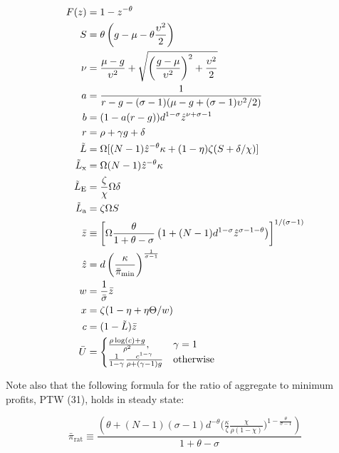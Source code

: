 \documentclass[11pt]{article}
\begin{document}
\begin{align}
	F(z) &= 1 - z^{-\theta} \\
	S &= \theta \left(g - \mu - \theta \frac{\upsilon^2}{2}\right) \\
	\nu &= \frac{\mu - g}{\upsilon^2} + \sqrt{\left(\frac{g - \mu}{\upsilon^2}\right)^2 + \frac{\upsilon^2}{2}} \\
	a &= \frac{1}{r - g - (\sigma - 1)(\mu - g  + (\sigma - 1)\upsilon^2/2)} \\
	b &= (1 - a(r-g))d^{1-\sigma}\hat{z}^{\nu + \sigma -1} \\
	r &= \rho + \gamma g + \delta \\
	\tilde{L} &= \Omega [(N-1)\hat{z}^{-\theta}\kappa + (1-\eta)\zeta(S + \delta/\chi)] \\
	\tilde{L}_{\text{x}} &= \Omega (N -1)\hat{z}^{-\theta}\kappa\\
	\tilde{L}_{\text{E}} &= \frac{\zeta}{\chi}\Omega\delta\\
	\tilde{L}_{\text{a}} &= \zeta \Omega S\\
	\bar{z}&\equiv \left[\Omega
	\frac{\theta}{1+\theta - \sigma}\left(1 + (N-1)d^{1-\sigma}\hat{z}^{\sigma - 1 -\theta} \right)\right]^{1/(\sigma - 1)} \\
	\hat{z} &= d \left(\frac{\kappa}{\bar{\pi}_{\textup{min}}}\right)^{\frac{1}{\sigma - 1}} \\
	w &= \frac{1}{\bar{\sigma}}\bar{z} \\
	x &= \zeta(1 - \eta + \eta \Theta / w) \\
		c &= (1 - \tilde{L})\bar{z} \\
		\bar{U} &=
	\begin{cases}
	\frac{\rho \log(c) + g}{\rho^2}, & \gamma = 1 \\
	\frac{1}{1-\gamma} \frac{c^{1 - \gamma}}{\rho + (\gamma - 1)g} & \text{otherwise}
	\end{cases}
\end{align}

Note also that the following formula for the ratio of aggregate to minimum profits, PTW (31), holds in steady state:

\begin{equation}
	\bar{\pi}_{\text{rat}} \equiv \frac{\left(\theta + (N-1)(\sigma-1)d^{-\theta}\big(\frac{\kappa}{\zeta} \frac{\chi}{\rho (1-\chi)}\big)^{1 - \frac{\theta}{\sigma - 1}}\right)}{1 + \theta - \sigma}
\end{equation}
\end{document}
